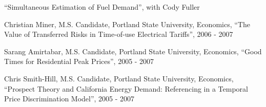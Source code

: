 \documentclass[Computer Science]{vita}
\begin{document}
\begin{vita}
\begin{Selected Publications}
\begin{Working Papers}
\item ``Simultaneous Estimation of Fuel Demand'', with Cody Fuller
 
\end{Working Papers}

  \end{Selected Publications}


  \begin{Instructional Activities}






    \begin{M.S. Project Adviser}

    \item Christian Miner, M.S. Candidate, Portland State University,
      Economics, ``The Value of Transferred Risks in Time-of-use
      Electrical Tariffs'', 2006 - 2007

    \item Sarang Amirtabar, M.S. Candidate, Portland State University,
      Economics, ``Good Times for Residential Peak Prices'', 2005 -
      2007

    \item Chris Smith-Hill, M.S. Candidate, Portland State University,
      Economics, ``Prospect Theory and California Energy Demand:
      Referencing in a Temporal Price Discrimination Model'', 2005 -
      2007
    \end{M.S. Project Adviser}

  \end{Instructional Activities}





\end{vita}
\end{document}
